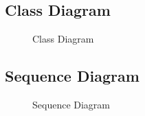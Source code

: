 \documentclass[a4paper,14pt,onecolumn]{report}
\begin{document}
	\subsection{Class Diagram}
	\begin{center}
		\begin{figure}[!htbp]
			\centering
			\caption{Class Diagram}
			\label{fig:class-dig}
		\end{figure}
	\end{center} 
	\newpage
	\subsection{Sequence Diagram}
	\begin{center}
		\begin{figure}[!htbp]
			\centering
			\caption{Sequence Diagram}
			\label{fig:seq-dig}
		\end{figure}
	\end{center} 
	\newpage
\end{document}
